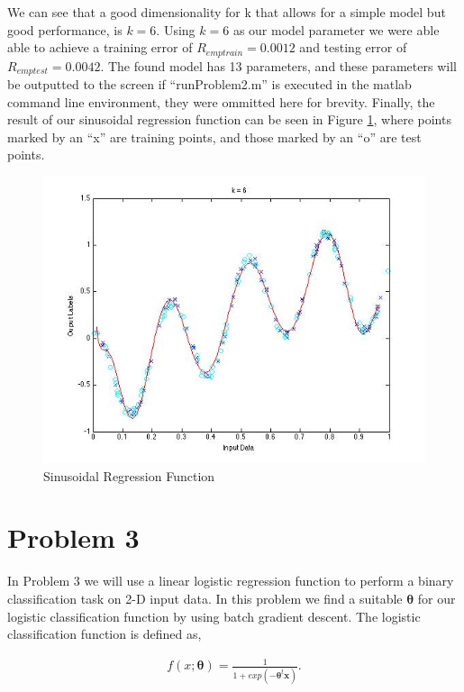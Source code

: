 \documentclass[paper=a4, fontsize=11pt]{scrartcl} %
\begin{document}
We can see that a good dimensionality for k that allows for a simple model but good performance, is $k=6$.  Using $k = 6$ as our model parameter we were able able to achieve a training error of $R_{emptrain} = 0.0012$ and testing error of $R_{emptest} = 0.0042$.  The found model has 13 parameters, and these parameters will be outputted to the screen if ``runProblem2.m'' is executed in the matlab command line environment, they were ommitted here for brevity.
Finally, the result of our sinusoidal regression function can be seen in Figure \ref{fig:prob2_curve}, where points marked by an ``x'' are training points, and those marked by an ``o'' are test points.

\begin{figure}
\centering
\includegraphics[scale=0.4]{prob2curve.jpg}
\caption{Sinusoidal Regression Function}
\label{fig:prob2_curve}
\end{figure}

\section{Problem 3}

In Problem 3 we will use a linear logistic regression function to perform a binary classification task on 2-D input data.  In this problem we find a suitable $\bm{\theta}$ for our logistic classification function by using batch gradient descent.  The logistic classification function is defined as, 

\begin{align}
f(x;\bm{\theta}) = \frac{1}{1+exp(-\bm{\theta}^t\bm{x})}.
\end{align}
\end{document}
